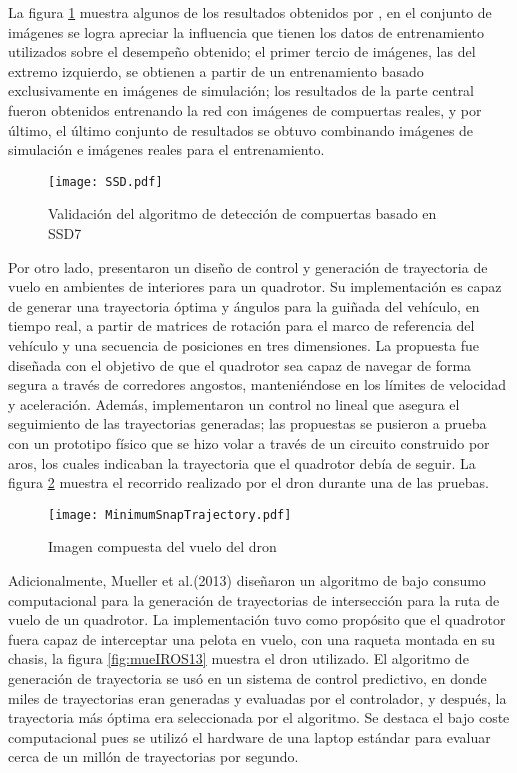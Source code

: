 La figura \ref{fig:SSD} muestra algunos de los resultados obtenidos por \cite{cabrera2019gate}, en el conjunto de imágenes se logra apreciar la influencia que tienen los datos de entrenamiento utilizados sobre el desempeño obtenido; el primer tercio de imágenes, las del extremo izquierdo, se obtienen a partir de un entrenamiento basado exclusivamente en imágenes de simulación; los resultados de la parte central fueron obtenidos entrenando la red con imágenes de compuertas reales, y por último, el último conjunto de resultados se obtuvo combinando imágenes de simulación e imágenes reales para el entrenamiento.

\begin{figure}[ht]
    \centering
    \texttt{[image: SSD.pdf]}
    \caption{Validación del algoritmo de detección de compuertas basado en SSD7 \cite{cabrera2019gate}}
    \label{fig:SSD}
\end{figure}

Por otro lado, \cite{mellinger2011minimum} presentaron un diseño de control y generación de trayectoria de vuelo en ambientes de interiores para un quadrotor. Su implementación es capaz de generar una trayectoria óptima y ángulos para la guiñada del vehículo, en tiempo real, a partir de matrices de rotación para el marco de referencia del vehículo y una secuencia de posiciones en tres dimensiones. La propuesta fue diseñada con el objetivo de que el quadrotor sea capaz de navegar de forma segura a través de corredores angostos, manteniéndose en los límites de velocidad y aceleración. Además, implementaron un control no lineal que asegura el seguimiento de las trayectorias generadas; las propuestas se pusieron a prueba con un prototipo físico  que se hizo volar a través de un circuito construido por aros, los cuales indicaban la trayectoria que el quadrotor debía de seguir. La figura \ref{fig:MinimumSnapTrajectory} muestra el recorrido realizado por el dron durante una de las pruebas.

\begin{figure}[ht]
    \centering
    \texttt{[image: MinimumSnapTrajectory.pdf]}
    \caption{Imagen compuesta del vuelo del dron \cite{mellinger2011minimum}}
    \label{fig:MinimumSnapTrajectory}
\end{figure}

Adicionalmente, Mueller et al.(2013)\cite{mueller2013computationally} diseñaron un algoritmo de bajo consumo computacional para la generación de trayectorias de intersección para la ruta de vuelo de un quadrotor. La implementación tuvo como propósito que el quadrotor fuera capaz de interceptar una pelota en vuelo, con una raqueta montada en su chasis, la figura \ref{fig:mueIROS13} muestra el dron utilizado. El algoritmo de generación de trayectoria se usó en un sistema de control predictivo, en donde miles de trayectorias eran generadas y evaluadas por el controlador, y después, la trayectoria más óptima era seleccionada por el algoritmo.  Se destaca el bajo coste computacional pues se utilizó el hardware de una laptop estándar para evaluar cerca de un millón de trayectorias por segundo.

